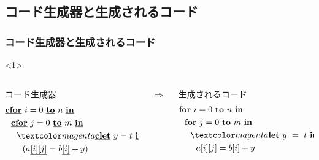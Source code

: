 \subsection{コード生成器と生成されるコード}
\begin{frame}
  \frametitle{コード生成器と生成されるコード}
  \begin{onlyenv}<1>
    \begin{columns}
      \begin{column}{0.5\textwidth}%
        コード生成器
        \begin{align*}
          & \cforin{i = 0}{n} \\
          & ~~\cforin{j = 0}{m} \\
          & ~~~~\magenta{\cLet~y=t~\cIn} \\
          & ~~~~~~(a\cArrays{i}{j} = b\cArray{i} + y)
        \end{align*}
      \end{column}
      $\Rightarrow$
      \begin{column}{0.5\textwidth}%
        生成されるコード
        \begin{align*}
          & \forin{i = 0}{n} \\
          & ~~\forin{j = 0}{m} \\
          & ~~~~\magenta{\Let ~y ~= ~t ~\In} \\
          & ~~~~~~a[i][j] = b[i] + y \\
        \end{align*}
      \end{column}
    \end{columns}
  \end{onlyenv}


\end{frame}

